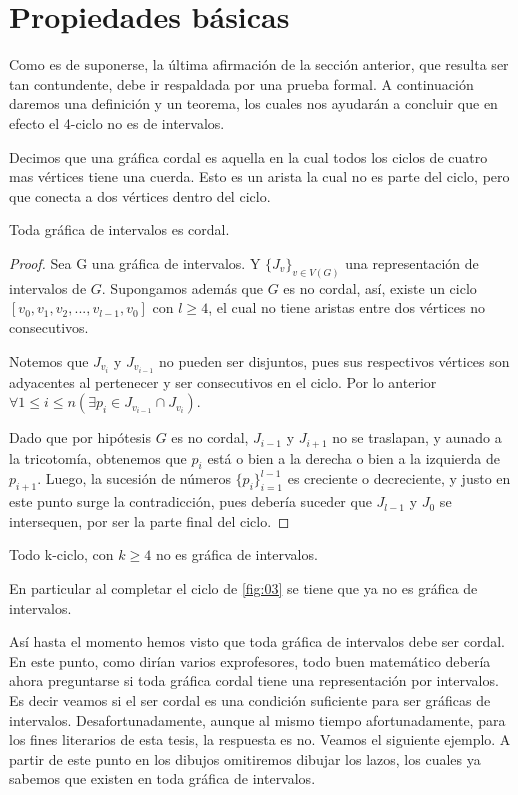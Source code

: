 \section{Propiedades b\'asicas}

Como es de suponerse, la última afirmación de la secci\'on anterior, que resulta
ser tan contundente, debe ir respaldada por una prueba formal. A continuación
daremos una definición y un teorema, los cuales nos ayudarán a concluir que en
efecto el 4-ciclo no es de intervalos.

Decimos que una gráfica cordal es aquella en la cual todos los ciclos de cuatro
mas vértices tiene una cuerda. Esto es un arista la cual no es parte del ciclo,
pero que conecta a dos vértices dentro del ciclo.

\begin{teorema}
\label{teo:Int-Chord}
    Toda gráfica de intervalos es cordal.
\end{teorema}

\begin{proof}
    Sea G una gráfica de intervalos. Y $\{ J_v \}_{v \in V(G)}$ una
    representación de intervalos de $G$. Supongamos además que $G$ es no cordal,
    así, existe un ciclo $[v_0,v_1,v_2,...,v_{l-1},v_0]$ con $l \geq 4$, el cual
    no tiene aristas entre dos vértices no consecutivos.
    
    Notemos que $J_{v_i}$ y $J_{v_{i-1}}$ no pueden ser disjuntos, pues sus
    respectivos vértices son adyacentes al pertenecer y ser consecutivos en el
    ciclo. Por lo anterior $\forall 1 \leq i \leq n  (\exists p_i \in
    J_{v_{i-1}}\cap J_{v_i})$.
    
    Dado que por hipótesis $G$ es no cordal, $J_{i-1}$ y $J_{i+1}$ no se
    traslapan, y aunado a la tricotomía, obtenemos que $p_i$ está o bien a la
    derecha o bien a la izquierda de $p_{i+1}$. Luego, la sucesión de números
    $\{ p_i \}_{i=1}^{l-1}$ es creciente o decreciente, y justo en este punto
    surge la contradicción, pues debería suceder que $J_{l-1}$ y $J_0$ se
    intersequen, por ser la parte final del ciclo.
\end{proof}

\begin{corolario}
    Todo k-ciclo, con $k \geq 4$ no es gráfica de intervalos. 
\end{corolario}

En particular al completar el ciclo de \cref{fig:03} se tiene que ya no es
gráfica de intervalos.

Así hasta el momento hemos visto que toda gráfica de intervalos debe ser cordal.
En este punto, como dirían varios exprofesores, todo buen matemático debería
ahora preguntarse si toda gráfica cordal tiene una representación por
intervalos. Es decir veamos si el ser cordal es una condición suficiente para
ser gráficas de intervalos. Desafortunadamente, aunque al mismo tiempo
afortunadamente, para los fines literarios de esta tesis, la respuesta es no.
Veamos el siguiente ejemplo. A partir de este punto en los dibujos omitiremos
dibujar los lazos, los cuales ya sabemos que existen en toda gráfica de
intervalos.


